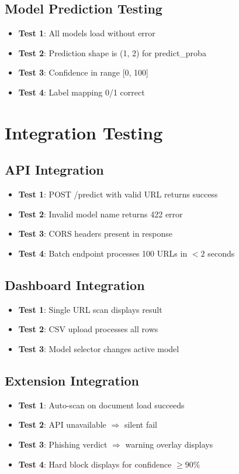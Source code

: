 \documentclass[12pt,a4paper]{report}
\begin{document}
\subsection{Model Prediction Testing}
\begin{itemize}[leftmargin=*]
    \item \textbf{Test 1}: All models load without error
    \item \textbf{Test 2}: Prediction shape is (1, 2) for predict\_proba
    \item \textbf{Test 3}: Confidence in range [0, 100]
    \item \textbf{Test 4}: Label mapping 0/1 correct
\end{itemize}

\section{Integration Testing}

\subsection{API Integration}
\begin{itemize}[leftmargin=*]
    \item \textbf{Test 1}: POST /predict with valid URL returns success
    \item \textbf{Test 2}: Invalid model name returns 422 error
    \item \textbf{Test 3}: CORS headers present in response
    \item \textbf{Test 4}: Batch endpoint processes 100 URLs in $<2$ seconds
\end{itemize}

\subsection{Dashboard Integration}
\begin{itemize}[leftmargin=*]
    \item \textbf{Test 1}: Single URL scan displays result
    \item \textbf{Test 2}: CSV upload processes all rows
    \item \textbf{Test 3}: Model selector changes active model
\end{itemize}

\subsection{Extension Integration}
\begin{itemize}[leftmargin=*]
    \item \textbf{Test 1}: Auto-scan on document load succeeds
    \item \textbf{Test 2}: API unavailable $\Rightarrow$ silent fail
    \item \textbf{Test 3}: Phishing verdict $\Rightarrow$ warning overlay displays
    \item \textbf{Test 4}: Hard block displays for confidence $\geq 90\%$
\end{itemize}
\end{document}
